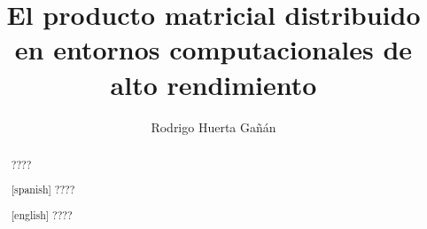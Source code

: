 \documentclass[11pt,spanish,listoffigures,listoftables]{plantilla/tfgetsinf}
\title{El producto matricial distribuido en entornos computacionales de alto rendimiento}
\author{Rodrigo Huerta Gañán}
\begin{document}
\hypersetup{linkcolor=black}

\begin{abstract}
????
\end{abstract}
\begin{abstract}[spanish]
????
\end{abstract}
\begin{abstract}[english]
????
\end{abstract}


\mainmatter













 


\cleardoublepage


%
%
%
%
%
%
%
%
%
\end{document}
